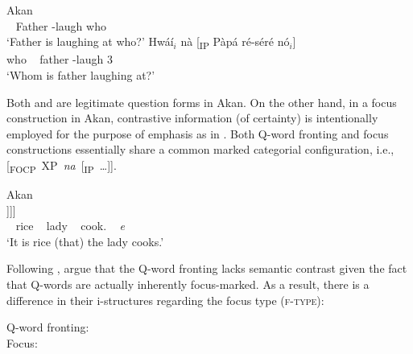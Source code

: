 \documentclass[output=paper,hidelinks]{langscibook}
\begin{document}
\ea\label{ex:African:56} Akan
\ea\label{ex:African:56a}
    \\
        ~ Father {\PROG}-laugh who\\
    \glt‘Father is laughing at who?’
\ex\label{ex:African:56b}
    \gll Hwáí$_i$ nà [\textsubscript{IP} Pàpá ré-séré nó$_i$]\\
        who   {\FOC}   ~ father   {\PROG}-laugh 3{\SG}\\
    \glt‘Whom is father laughing at?’
\z
\z

Both  and  are legitimate question
forms in Akan. On the other hand, in a focus construction in Akan,
contrastive information (of certainty) is intentionally employed for
the purpose of emphasis as in . Both Q-word fronting
and focus constructions essentially share a common marked categorial
configuration, i.e., \mbox{[\textsubscript{FOCP} XP \textit{na}
    [\textsubscript{IP} …]]}.

\ea\label{ex:African:57} Akan\\
    \gll [\textsubscript{FOCP} ɛmóó$_i$ nà [\textsubscript{IP} ɔbáá nó
        [\textsubscript{VP} nóá [\textsubscript{NP} Ø$_i$]]]]\\
        ~ rice      {\FOC}   ~   lady  {\DEF}  ~  cook.    ~ \textit{e}\\
    \glt ‘It is rice (that) the lady cooks.’
    \z

\hspace*{-2.2pt}Following \citet{Boadi1990}, \citet{MB05} argue that the Q-word fronting lacks semantic contrast given the fact that Q-words are actually inherently focus-marked. As a result, there is a difference in their i-structures regarding the focus type (\textsc{f-type}):

\ea\label{ex:African:58}
\ea\label{ex:African:58a}Q-word fronting:\\[1ex]
\ex\label{ex:African:58b}Focus:\\[1ex]
\z
\z
\end{document}
